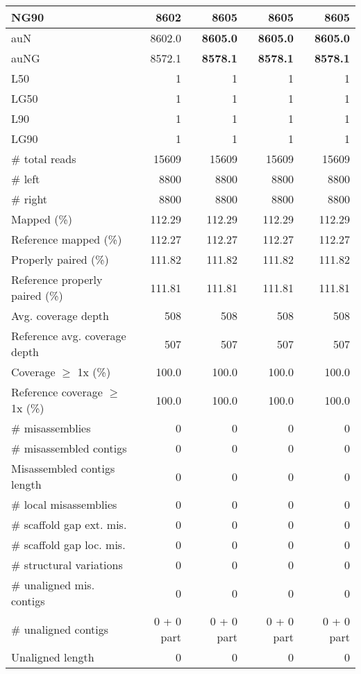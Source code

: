 \documentclass[12pt,a4paper]{article}
\begin{document}
\begin{table}[ht]
\begin{center}
\begin{tabular}{|l*{4}{|r}|}
NG90 & 8602 & {\bf 8605} & {\bf 8605} & {\bf 8605} \\ \hline
auN & 8602.0 & {\bf 8605.0} & {\bf 8605.0} & {\bf 8605.0} \\ \hline
auNG & 8572.1 & {\bf 8578.1} & {\bf 8578.1} & {\bf 8578.1} \\ \hline
L50 & 1 & 1 & 1 & 1 \\ \hline
LG50 & 1 & 1 & 1 & 1 \\ \hline
L90 & 1 & 1 & 1 & 1 \\ \hline
LG90 & 1 & 1 & 1 & 1 \\ \hline
\# total reads & 15609 & 15609 & 15609 & 15609 \\ \hline
\# left & 8800 & 8800 & 8800 & 8800 \\ \hline
\# right & 8800 & 8800 & 8800 & 8800 \\ \hline
Mapped (\%) & 112.29 & 112.29 & 112.29 & 112.29 \\ \hline
Reference mapped (\%) & 112.27 & 112.27 & 112.27 & 112.27 \\ \hline
Properly paired (\%) & 111.82 & 111.82 & 111.82 & 111.82 \\ \hline
Reference properly paired (\%) & 111.81 & 111.81 & 111.81 & 111.81 \\ \hline
Avg. coverage depth & 508 & 508 & 508 & 508 \\ \hline
Reference avg. coverage depth & 507 & 507 & 507 & 507 \\ \hline
Coverage $\geq$ 1x (\%) & 100.0 & 100.0 & 100.0 & 100.0 \\ \hline
Reference coverage $\geq$ 1x (\%) & 100.0 & 100.0 & 100.0 & 100.0 \\ \hline
\# misassemblies & 0 & 0 & 0 & 0 \\ \hline
\# misassembled contigs & 0 & 0 & 0 & 0 \\ \hline
Misassembled contigs length & 0 & 0 & 0 & 0 \\ \hline
\# local misassemblies & 0 & 0 & 0 & 0 \\ \hline
\# scaffold gap ext. mis. & 0 & 0 & 0 & 0 \\ \hline
\# scaffold gap loc. mis. & 0 & 0 & 0 & 0 \\ \hline
\# structural variations & 0 & 0 & 0 & 0 \\ \hline
\# unaligned mis. contigs & 0 & 0 & 0 & 0 \\ \hline
\# unaligned contigs & 0 + 0 part & 0 + 0 part & 0 + 0 part & 0 + 0 part \\ \hline
Unaligned length & 0 & 0 & 0 & 0 \\ \hline

\end{tabular}
\end{center}
\end{table}
\end{document}
